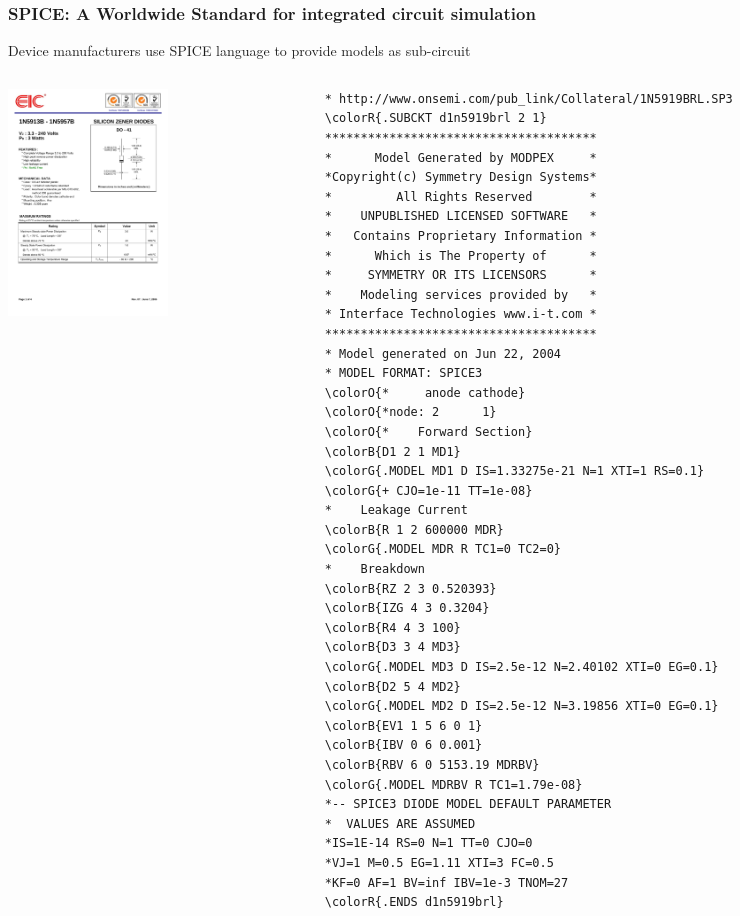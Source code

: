 \begin{frame}[fragile]
  \frametitle{SPICE: A Worldwide Standard for integrated circuit simulation}
  \centerline{Device manufacturers use SPICE language to provide models as sub-circuit}
  \begin{columns}
    \begin{column}{.5\textwidth}
      \begin{center}
        \includegraphics[height=6cm]{figures/1N5919B-1.pdf}
      \end{center}
    \end{column}
    \begin{column}{.5\textwidth}
      \fontsize{4.25pt}{4.25pt}\selectfont
      \begin{Verbatim}[commandchars=\\\{\}]
* http://www.onsemi.com/pub_link/Collateral/1N5919BRL.SP3
\colorR{.SUBCKT d1n5919brl 2 1}
**************************************
*      Model Generated by MODPEX     *
*Copyright(c) Symmetry Design Systems*
*         All Rights Reserved        *
*    UNPUBLISHED LICENSED SOFTWARE   *
*   Contains Proprietary Information *
*      Which is The Property of      *
*     SYMMETRY OR ITS LICENSORS      *
*    Modeling services provided by   *
* Interface Technologies www.i-t.com *
**************************************
* Model generated on Jun 22, 2004
* MODEL FORMAT: SPICE3
\colorO{*     anode cathode}
\colorO{*node: 2      1}
\colorO{*    Forward Section}
\colorB{D1 2 1 MD1}
\colorG{.MODEL MD1 D IS=1.33275e-21 N=1 XTI=1 RS=0.1}
\colorG{+ CJO=1e-11 TT=1e-08}
*    Leakage Current
\colorB{R 1 2 600000 MDR}
\colorG{.MODEL MDR R TC1=0 TC2=0}
*    Breakdown
\colorB{RZ 2 3 0.520393}
\colorB{IZG 4 3 0.3204}
\colorB{R4 4 3 100}
\colorB{D3 3 4 MD3}
\colorG{.MODEL MD3 D IS=2.5e-12 N=2.40102 XTI=0 EG=0.1}
\colorB{D2 5 4 MD2}
\colorG{.MODEL MD2 D IS=2.5e-12 N=3.19856 XTI=0 EG=0.1}
\colorB{EV1 1 5 6 0 1}
\colorB{IBV 0 6 0.001}
\colorB{RBV 6 0 5153.19 MDRBV}
\colorG{.MODEL MDRBV R TC1=1.79e-08}
*-- SPICE3 DIODE MODEL DEFAULT PARAMETER
*  VALUES ARE ASSUMED
*IS=1E-14 RS=0 N=1 TT=0 CJO=0
*VJ=1 M=0.5 EG=1.11 XTI=3 FC=0.5
*KF=0 AF=1 BV=inf IBV=1e-3 TNOM=27
\colorR{.ENDS d1n5919brl}
      \end{Verbatim}
      \normalsize
    \end{column}
  \end{columns}
\end{frame}

